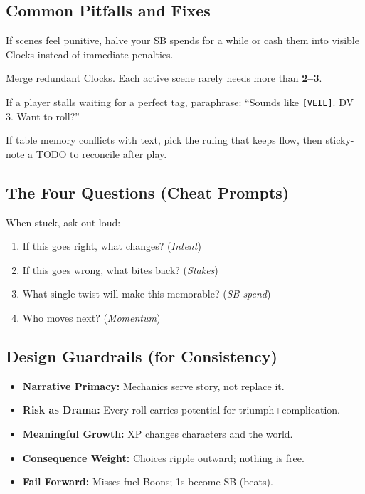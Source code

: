 \subsection{Common Pitfalls and Fixes}
\begin{description}[leftmargin=1.5em, style=nextline]
  \item[Over-cranking SB:] If scenes feel punitive, halve your SB spends for a while or cash them into visible Clocks instead of immediate penalties.
  \item[Clock Sprawl:] Merge redundant Clocks. Each active scene rarely needs more than \textbf{2--3}.
  \item[Tag Paralysis:] If a player stalls waiting for a perfect tag, paraphrase: ``Sounds like \texttt{[VEIL]}. DV 3. Want to roll?''
  \item[Rules Drift:] If table memory conflicts with text, pick the ruling that keeps flow, then sticky-note a TODO to reconcile after play.
\end{description}

\subsection{The Four Questions (Cheat Prompts)}
When stuck, ask out loud:
\begin{enumerate}
  \item If this goes right, what changes? (\emph{Intent})
  \item If this goes wrong, what bites back? (\emph{Stakes})
  \item What single twist will make this memorable? (\emph{SB spend})
  \item Who moves next? (\emph{Momentum})
\end{enumerate}

\subsection{Design Guardrails (for Consistency)}
\begin{itemize}
  \item \textbf{Narrative Primacy:} Mechanics serve story, not replace it.
  \item \textbf{Risk as Drama:} Every roll carries potential for triumph+complication.
  \item \textbf{Meaningful Growth:} XP changes characters and the world.
  \item \textbf{Consequence Weight:} Choices ripple outward; nothing is free.
  \item \textbf{Fail Forward:} Misses fuel Boons; 1s become SB (beats).
\end{itemize}

